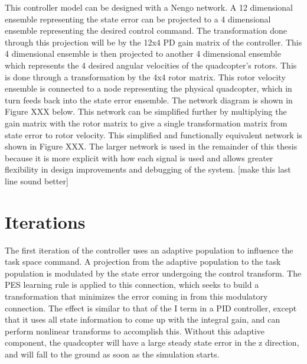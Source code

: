 \documentclass[letterpaper,12pt,titlepage,oneside,final]{book}
\begin{document}
This controller model can be designed with a Nengo network. 
A 12 dimensional ensemble representing the state error can be projected to a 4 dimensional ensemble representing the desired control command. 
The transformation done through this projection will be by the 12x4 PD gain matrix of the controller. 
This 4 dimensional ensemble is then projected to another 4 dimensional ensemble which represents the 4 desired angular velocities of the quadcopter’s rotors. 
This is done through a transformation by the 4x4 rotor matrix. 
This rotor velocity ensemble is connected to a node representing the physical quadcopter, which in turn feeds back into the state error ensemble. 
The network diagram is shown in Figure XXX below. 
This network can be simplified further by multiplying the gain matrix with the rotor matrix to give a single transformation matrix from state error to rotor velocity. 
This simplified and functionally equivalent network is shown in Figure XXX. The larger network is used in the remainder of this thesis because it is more explicit with how each signal is used and allows greater flexibility in design improvements and debugging of the system. [make this last line sound better]


\section{Iterations}


The first iteration of the controller uses an adaptive population to influence the task space command. 
A projection from the adaptive population to the task population is modulated by the state error undergoing the control transform. 
The PES learning rule is applied to this connection, which seeks to build a transformation that minimizes the error coming in from this modulatory connection. 
The effect is similar to that of the I term in a PID controller, except that it uses all state information to come up with the integral gain, and can perform nonlinear transforms to accomplish this. Without this adaptive component, the quadcopter will have a large steady state error in the z direction, and will fall to the ground as soon as the simulation starts.
\end{document}
